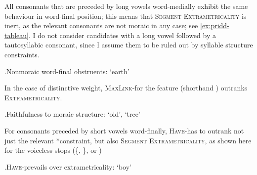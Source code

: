 All consonants that are preceded by long vowels word-medially exhibit the same behaviour in word-final position; this means that \textsc{Segment Extrametricality} is inert, as the relevant consonants are not moraic in any case; see \ref{ex:pridd-tableau}. I do not consider candidates with a long vowel followed by a tautosyllabic consonant, since I assume them to be ruled out by syllable structure constraints.

\ex.\label{ex:pridd-tableau}Nonmoraic word-final obstruents: \ipa{[ˈpriːð]} `earth'\\

In the case of distinctive weight, \textsc{MaxLink}-\mo for the feature  (shorthand ) outranks \textsc{Extrametricality}.

\ex.Faithfulness to moraic structure: \ipa{[ˈheːn]} `old', \ipa{[ˈpren]} `tree'\\
\begin{OTmultitableau}{4}
\end{OTmultitableau}

For consonants preceded by short vowels word-finally, \textsc{Have}-\mo has to outrank not just the relevant *\mo constraint, but also \textsc{Segment Extrametricality}, as shown here for the voiceless stops (\{, \}, or )

\ex.\label{krut-tbl}\textsc{Have}-\mo prevails over extrametricality: \ipa{[ˈkrut]} `boy'\\
\begin{OTmultitableau}{4}
\end{OTmultitableau}

